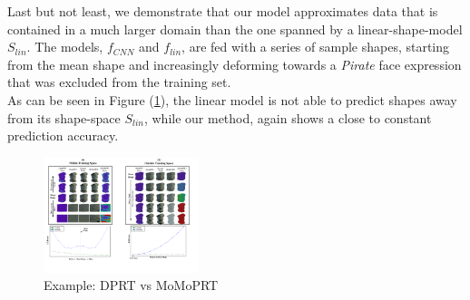 Last but not least, we demonstrate that our model approximates data that is contained in a much larger domain than the one spanned by a linear-shape-model $S_{lin}$. The models, $f_{CNN}$ and $f_{lin}$, are fed with a series of sample shapes, starting from the mean shape and increasingly deforming towards a \textit{Pirate} face expression that was excluded from the training set. \\
As can be seen in Figure (\ref{Fig:DPRT vs MoMoPRT B}), the linear model is not able to predict shapes away from its shape-space $S_{lin}$, while our method, again shows a close to constant prediction accuracy.
\begin{figure}[h]
  \centering
    \includegraphics[width=0.4\textwidth]{Figures/DPRT_vs_MoMoPRT_b.pdf}
     \caption{Example: DPRT vs MoMoPRT}
     \label{Fig:DPRT vs MoMoPRT B}
\end{figure}

